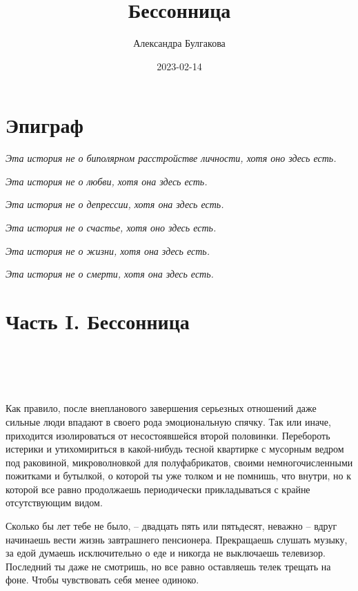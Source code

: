 \documentclass[
]{book}
\title{Бессонница}
\author{Александра Булгакова}
\date{2023-02-14}
\begin{document}
\maketitle

{
\setcounter{tocdepth}{1}
\tableofcontents
}
\hypertarget{ux44dux43fux438ux433ux440ux430ux444}{%
\chapter*{Эпиграф}\label{ux44dux43fux438ux433ux440ux430ux444}}

\emph{Эта история не о биполярном расстройстве личности, хотя оно здесь есть.}

\emph{Эта история не о любви, хотя она здесь есть.}

\emph{Эта история не о депрессии, хотя она здесь есть.}

\emph{Эта история не о счастье, хотя оно здесь есть.}

\emph{Эта история не о жизни, хотя она здесь есть.}

\emph{Эта история не о смерти, хотя она здесь есть.}

\hypertarget{ux447ux430ux441ux442ux44c-i.-ux431ux435ux441ux441ux43eux43dux43dux438ux446ux430}{%
\chapter*{Часть I. Бессонница}\label{ux447ux430ux441ux442ux44c-i.-ux431ux435ux441ux441ux43eux43dux43dux438ux446ux430}}

\hypertarget{chapter-1}{%
\chapter{~}\label{chapter-1}}

Как правило, после внепланового завершения серьезных отношений даже сильные люди впадают в своего рода эмоциональную спячку. Так или иначе, приходится изолироваться от несостоявшейся второй половинки. Перебороть истерики и утихомириться в какой-нибудь тесной квартирке с мусорным ведром под раковиной, микроволновкой для полуфабрикатов, своими немногочисленными пожитками и бутылкой, о которой ты уже толком и не помнишь, что внутри, но к которой все равно продолжаешь периодически прикладываться с крайне отсутствующим видом.

Сколько бы лет тебе не было, -- двадцать пять или пятьдесят, неважно -- вдруг начинаешь вести жизнь завтрашнего пенсионера. Прекращаешь слушать музыку, за едой думаешь исключительно о еде и никогда не выключаешь телевизор. Последний ты даже не смотришь, но все равно оставляешь телек трещать на фоне. Чтобы чувствовать себя менее одиноко.
\end{document}
